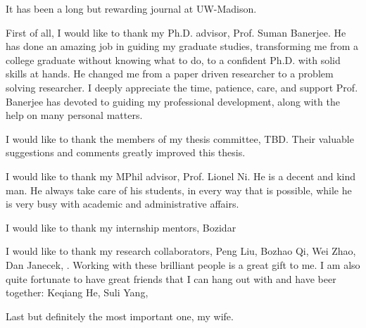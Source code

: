 \begin{acknowledgments}

It has been a long but rewarding journal at UW-Madison.

First of all, I would like to thank my Ph.D. advisor, Prof. Suman Banerjee. 
He has done an amazing job in guiding my graduate studies, transforming me
from a college graduate without knowing what to do, to a confident Ph.D. with
solid skills at hands. 
He changed me from a paper driven researcher to a problem solving researcher. 
I deeply appreciate the time, patience, care, 
and support Prof. Banerjee has devoted to guiding my professional
development, along with the help on many personal matters. 
 
I would like to thank the members of my thesis committee, TBD. 
Their valuable suggestions and comments greatly improved this thesis.
 
I would like to thank my MPhil advisor, Prof. Lionel Ni. 
He is a decent and kind man. 
He always take care of his students, in every way that is possible, 
while he is very busy with academic and administrative affairs. 


I would like to thank my internship mentors, Bozidar

 
I would like to thank my research collaborators, 
Peng Liu,
Bozhao Qi,
Wei Zhao,
Dan Janecek,
. 
Working with these brilliant people is a great gift to me. 
I am also quite fortunate to have great friends that I can hang out with and have
beer together: 
Keqiang He,
Suli Yang,


Last but definitely the most important one, my wife.  


\end{acknowledgments}

\tableofcontents






